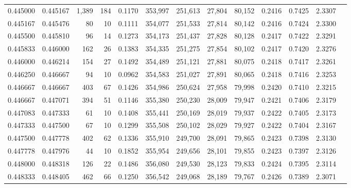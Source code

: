 \begin{tabular}{rrrrrrrrrrrrr}
0.445000 & 0.445167 & 1,389 & 184 &                                     0.1170 & 353,997 & 251,613 &  27,804 &  80,152 & 0.2416 & 0.7425 & 2.3307 \\
0.445167 & 0.445476 &    80 &  10 &                                     0.1111 & 354,077 & 251,533 &  27,814 &  80,142 & 0.2416 & 0.7424 & 2.3300 \\
0.445500 & 0.445810 &    96 &  14 &                                     0.1273 & 354,173 & 251,437 &  27,828 &  80,128 & 0.2417 & 0.7422 & 2.3291 \\
0.445833 & 0.446000 &   162 &  26 &                                     0.1383 & 354,335 & 251,275 &  27,854 &  80,102 & 0.2417 & 0.7420 & 2.3276 \\
0.446000 & 0.446214 &   154 &  27 &                                     0.1492 & 354,489 & 251,121 &  27,881 &  80,075 & 0.2418 & 0.7417 & 2.3261 \\
0.446250 & 0.446667 &    94 &  10 &                                     0.0962 & 354,583 & 251,027 &  27,891 &  80,065 & 0.2418 & 0.7416 & 2.3253 \\
0.446667 & 0.446667 &   403 &  67 &                                     0.1426 & 354,986 & 250,624 &  27,958 &  79,998 & 0.2420 & 0.7410 & 2.3215 \\
0.446667 & 0.447071 &   394 &  51 &                                     0.1146 & 355,380 & 250,230 &  28,009 &  79,947 & 0.2421 & 0.7406 & 2.3179 \\
0.447083 & 0.447333 &    61 &  10 &                                     0.1408 & 355,441 & 250,169 &  28,019 &  79,937 & 0.2422 & 0.7405 & 2.3173 \\
0.447333 & 0.447500 &    67 &  10 &                                     0.1299 & 355,508 & 250,102 &  28,029 &  79,927 & 0.2422 & 0.7404 & 2.3167 \\
0.447500 & 0.447778 &   402 &  62 &                                     0.1336 & 355,910 & 249,700 &  28,091 &  79,865 & 0.2423 & 0.7398 & 2.3130 \\
0.447778 & 0.447976 &    44 &  10 &                                     0.1852 & 355,954 & 249,656 &  28,101 &  79,855 & 0.2423 & 0.7397 & 2.3126 \\
0.448000 & 0.448318 &   126 &  22 &                                     0.1486 & 356,080 & 249,530 &  28,123 &  79,833 & 0.2424 & 0.7395 & 2.3114 \\
0.448333 & 0.448405 &   462 &  66 &                                     0.1250 & 356,542 & 249,068 &  28,189 &  79,767 & 0.2426 & 0.7389 & 2.3071 \\

\end{tabular}

